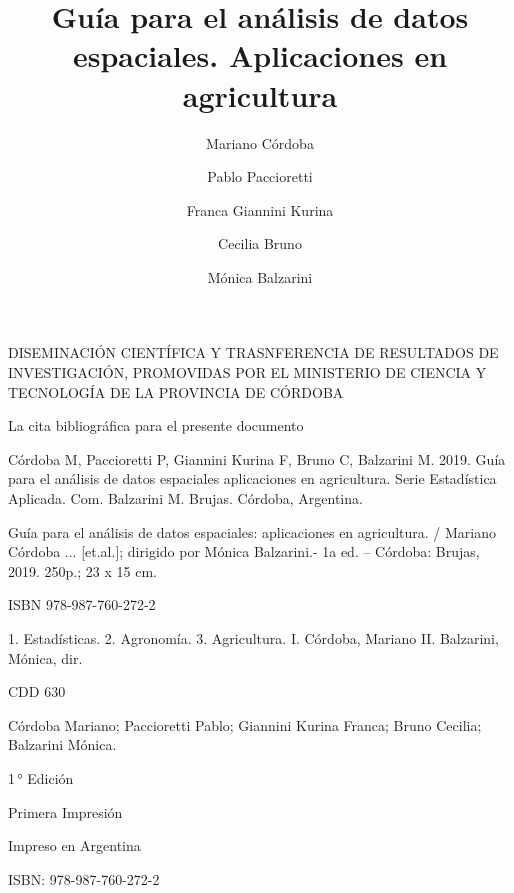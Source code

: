 \documentclass[11pt,b5paper,]{krantz}
\title{Guía para el análisis de datos espaciales. Aplicaciones en agricultura}
\author{Mariano Córdoba \and Pablo Paccioretti \and Franca Giannini Kurina \and Cecilia Bruno \and Mónica Balzarini}
\date{}
\begin{document}
\maketitle



\begin{center}
	{DISEMINACIÓN CIENTÍFICA Y TRASNFERENCIA DE RESULTADOS DE INVESTIGACIÓN, PROMOVIDAS POR EL MINISTERIO DE CIENCIA Y TECNOLOGÍA DE LA PROVINCIA DE CÓRDOBA}
\end{center}

\medskip

La cita bibliográfica para el presente documento

Córdoba M, Paccioretti P, Giannini Kurina F, Bruno C, Balzarini M. 2019. Guía para el análisis de datos espaciales\: aplicaciones en agricultura. Serie Estadística Aplicada. Com. Balzarini M. Brujas. Córdoba, Argentina.

\bigskip

\begin{framed}
\smallskip
   {\scriptsize Guía para el análisis de datos espaciales: aplicaciones en agricultura. / Mariano Córdoba ... [et.al.]; dirigido por Mónica Balzarini.- 1a ed. – Córdoba: Brujas, 2019.  250p.; 23 x 15 cm.
    
   ISBN 978-987-760-272-2
            
 1. Estadísticas. 2. Agronomía. 3. Agricultura. I. Córdoba, Mariano II. Balzarini, Mónica, dir. 


   CDD 630}
   
\smallskip

\end{framed}

\medskip
\textcopyright    Córdoba Mariano; Paccioretti Pablo; Giannini Kurina Franca; Bruno Cecilia; Balzarini Mónica.

{ 

1\,° Edición 

Primera Impresión

Impreso en Argentina

ISBN: 978-987-760-272-2

}
\end{document}
